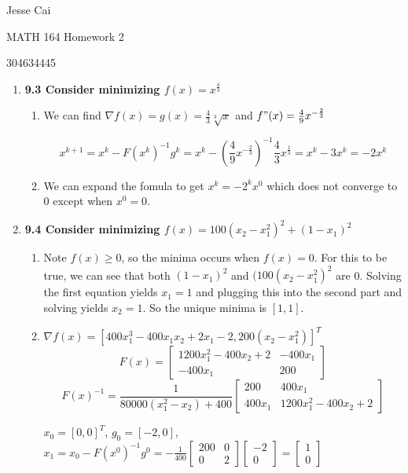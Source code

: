 \documentclass[10pt,a4paper]{article}
\begin{document}
Jesse Cai

MATH 164 Homework 2

304634445

\begin{enumerate}
    \item \textbf{9.3 Consider minimizing $f(x) = x^{\frac{4}{3}}$}
    \begin{enumerate}
        \item We can find $\nabla f(x) = g(x) = \frac{4}{3}\sqrt[3]x$ and $f"(x) =  \frac{4}{9} x^{- \frac{2}{3}}$
        
        $$x^{k+1} = x^k - F(x^k)^{-1}g^k = x^k - (\frac{4}{9}x^{-\frac{2}{3}})^{-1} \frac{4}{3} x^{\frac{1}{3}} = x^k - 3x^k = -2x^k$$
        
        \item We can expand the fomula to get $x^k = -2^k x^0$ which does not converge to 0 except when $x^0 = 0$.
    \end{enumerate}

    \item \textbf{9.4 Consider minimizing $f(x) = 100 (x_2 - x_1^2)^2 + (1 - x_1)^2$}
    \begin{enumerate}
        \item Note $f(x) \geq 0$, so the minima occurs when $f(x) = 0$. For this to be true, we can see that both $(1-x_1)^2$ and $(100(x_2 - x_1^2)^2$ are 0. 
        Solving the first equation yields $x_1 = 1$ and plugging this into the second part and solving yields $x_2 = 1$. So the unique minima is $[1,1]$.

        \item $\nabla f(x) = [400x_1^3 - 400x_1x_2 + 2x_1 -2, 200(x_2-x_1^2)]^T$
        $$F(x) = \begin{bmatrix} 1200x_1^2 - 400x_2 +2 & -400x_1 \\ -400x_1 & 200 \end{bmatrix}$$        
        $$F(x)^{-1} = \frac{1}{80000(x_1^2 -x_2) + 400} \begin{bmatrix} 200 & 400x_1 \\400x_1 & 1200x_1^2 - 400x_2 +2 \end{bmatrix}$$        

        $x_0 = [0, 0]^T$, $g_0 = [-2, 0]$, $x_1 = x_0 - F(x^0)^{-1} g^0  =  - \frac{1}{400} \begin{bmatrix} 200 & 0 \\ 0 & 2 \end{bmatrix} \begin{bmatrix} -2 \\ 0 \end{bmatrix} = \begin{bmatrix}1 \\0 \end{bmatrix}$


\end{enumerate}
\end{enumerate}
\end{document}
